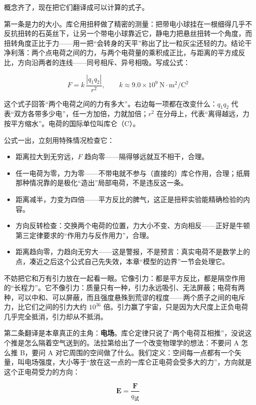 \begin{mainline}
概念齐了，现在把它们翻译成可以计算的式子。

第一条是力的大小。库仑用扭秤做了精密的测量：把带电小球挂在一根细得几乎不反抗扭转的石英丝下，让另一个带电小球靠近它，静电力把悬丝扭转一个角度，而扭转角度正比于力——用一把“会转身的天平”称出了比一粒灰尘还轻的力。结论干净利落：两个点电荷之间的力，与两个电荷量的乘积成正比，与距离的平方成反比，方向沿两者的连线——同号相斥、异号相吸。写成公式：

\[ F = k\,\frac{|q_1 q_2|}{r^2},\qquad k \approx 9.0\times 10^{9}\ \mathrm{N\cdot m^2/C^2} \]

这个式子回答“两个电荷之间的力有多大”。右边每一项都在改变什么：\(q_1 q_2\) 代表“双方各带多少电”，任一方加倍，力就加倍；\(r^2\) 在分母上，代表“离得越远，力按平方缩水”。电荷的国际单位叫库仑（C）。

公式一出，立刻用特殊情况检查它：

\begin{itemize}
  \item 距离拉大到无穷远，\(F\) 趋向零——隔得够远就互不相干，合理。
  \item 任一电荷为零，力为零——不带电就不参与（直接的）库仑作用，合理；纸屑那种情况靠的是极化“造出”局部电荷，不是违反这一条。
  \item 距离减半，力变为四倍——平方反比的脾气，这正是扭秤实验能精确检验的内容。
  \item 方向反转检查：交换两个电荷的位置，力大小不变、方向相反——正好是牛顿第三定律要求的“作用力与反作用力”，合理。
  \item 距离趋向零，力趋向无穷大——这是警报，不是预言：真实电荷不是数学上的点，凑近之后这个公式自己先失效，本章“模型的边界”一节会处理它。
\end{itemize}

不妨把它和万有引力放在一起看一眼。它像引力：都是平方反比，都是隔空作用的“长程力”。它不像引力：质量只有一种，引力永远吸引、无法屏蔽；电荷有两种，可以中和、可以屏蔽，而且强度悬殊到荒谬的程度——两个质子之间的电斥力，比它们之间的引力大约 \(10^{36}\) 倍。引力赢了宇宙，只是因为大尺度上正负电荷几乎完全抵消，引力却从不抵消。

第二条翻译是本章真正的主角：\textbf{电场}。库仑定律只说了“两个电荷互相推”，没说这个推是怎么隔着空气送到的。法拉第给出了一个改变物理学的想法：不要问 A 怎么推 B，要问 A 对它周围的空间做了什么。我们定义：空间每一点都有一个矢量，叫电场强度，大小等于“放在这一点的一库仑正电荷会受多大的力”，方向就是这个正电荷受力的方向：

\[ \mathbf E = \frac{\mathbf F}{q_{\text{试}}} \]


\end{mainline}
